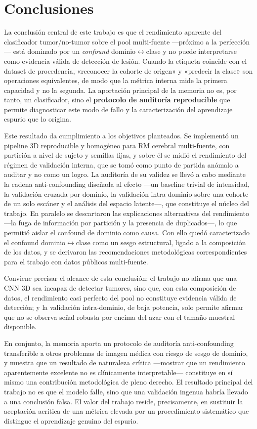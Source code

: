 \chapter{Conclusiones}
\label{apdo:conclusiones}

La conclusión central de este trabajo es que el rendimiento aparente del
clasificador tumor/no-tumor sobre el pool multi-fuente ---próximo a la
perfección--- está dominado por un \emph{confound} dominio$\leftrightarrow$clase y
no puede interpretarse como evidencia válida de detección de lesión. Cuando la
etiqueta coincide con el dataset de procedencia, «reconocer la cohorte de origen»
y «predecir la clase» son operaciones equivalentes, de modo que la métrica interna
mide la primera capacidad y no la segunda. La aportación principal de la memoria
no es, por tanto, un clasificador, sino el \textbf{protocolo de auditoría
reproducible} que permite diagnosticar este modo de fallo y la caracterización
del aprendizaje espurio que lo origina.

Este resultado da cumplimiento a los objetivos planteados. Se implementó un
pipeline 3D reproducible y homogéneo para RM cerebral multi-fuente, con partición
a nivel de sujeto y semillas fijas, y sobre él se midió el rendimiento del régimen
de validación interna, que se tomó como punto de partida anómalo a auditar y no
como un logro. La auditoría de su validez se llevó a cabo mediante la cadena
anti-confounding diseñada al efecto ---un baseline trivial de intensidad, la
validación cruzada por dominio, la validación intra-dominio sobre una cohorte de un
solo escáner y el análisis del espacio latente---, que constituye el núcleo del
trabajo. En paralelo se descartaron las explicaciones alternativas del rendimiento
---la fuga de información por partición y la presencia de duplicados---, lo que
permitió aislar el confound de dominio como causa. Con ello quedó caracterizado el
confound dominio$\leftrightarrow$clase como un sesgo estructural, ligado a la
composición de los datos, y se derivaron las recomendaciones metodológicas
correspondientes para el trabajo con datos públicos multi-fuente.

Conviene precisar el alcance de esta conclusión: el trabajo no afirma que una
CNN 3D sea incapaz de detectar tumores, sino que, con esta composición de datos,
el rendimiento casi perfecto del pool no constituye evidencia válida de detección;
y la validación intra-dominio, de baja potencia, solo permite afirmar que no se
observa señal robusta por encima del azar con el tamaño muestral disponible.

En conjunto, la memoria aporta un protocolo de auditoría anti-confounding
transferible a otros problemas de imagen médica con riesgo de sesgo de dominio, y
muestra que un resultado de naturaleza crítica ---mostrar que un rendimiento
aparentemente excelente no es clínicamente interpretable--- constituye en sí mismo
una contribución metodológica de pleno derecho. El resultado principal del
trabajo no es que el modelo falle, sino que una validación ingenua habría llevado
a una conclusión falsa. El valor del trabajo reside,
precisamente, en sustituir la aceptación acrítica de una métrica elevada por un
procedimiento sistemático que distingue el aprendizaje genuino del espurio.
